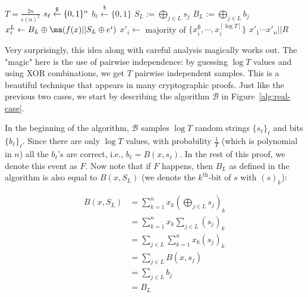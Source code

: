 \begin{marginfigure}
    \begin{algorithmic}
    \State $T = \frac{2n}{\epsilon(n)^2}$
            \State $s_\ell \stackrel{\$}{\leftarrow} \{0,1\}^{n}$
            \State $b_\ell \stackrel{\$}{\leftarrow} \{0,1\}$
        \EndFor
            \State $S_L :=\bigoplus_{j \in L} s_j$
            \State $B_L := \bigoplus_{j \in L} b_j$
            \State $x_i^L \leftarrow B_L \oplus \ma(f(x) || S_L\oplus e^i)$
        \EndFor
        \State $x'_i \gets $ majority of $\{x_i^\emptyset, \cdots, x_i^{[\log T]}\}$
    \EndFor
    \State \Return $x'_1\cdots x'_n||R$
    \end{algorithmic}
    \caption{Real Case $\mathcal{B}$} \label{alg:real-case}
    \end{marginfigure}
Very surprisingly, this idea along with careful analysis magically works out. The "magic" here is the use of pairwise independence: by guessing $\log T$ values and using XOR combinations, we get $T$ pairwise independent samples. This is a beautiful technique that appears in many cryptographic proofs.
Just like the previous two cases, we start by describing the algorithm $\mathcal{B}$ in Figure~\ref{alg:real-case}.



In the beginning of the algorithm, $\mathcal{B}$ samples $\log T$ random strings $\{ s_\ell \}_{\ell}$ and bits $\{ b_\ell \}_{\ell}$.
Since there are only $\log T$ values, with probability $\frac{1}{T}$ (which is polynomial in $n$) all the $b_{\ell}$'s are correct, i.e., $b_\ell = B(x, s_\ell)$. In the rest of this proof, we denote this event as $F$.
Now note that if $F$ happens, then $B_L$ as defined in the algorithm is also equal to $B(x, S_L)$ (we denote the $k^{\text{th}}$-bit of $s$ with $(s)_k$): 

\begin{align*}
B(x,S_L) &= \sum_{k=1}^n x_k (\bigoplus_{j \in L} s_j)_k \\ 
         &=  \sum_{k=1}^n x_k \sum_{j \in L} \left(s_j\right)_k \\
         &= \sum_{j \in L} \sum_{k=1}^n x_k (s_j)_k \\
         &= \sum_{j \in L} B(x,s_j) \\
         &= \sum_{j\in L} b_j  \\
         &= B_L
\end{align*}

